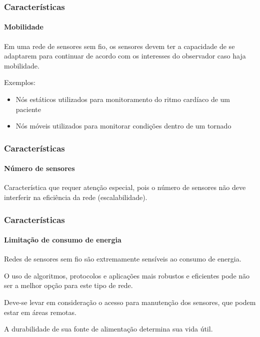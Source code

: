 \documentclass[notes]{beamer}
\begin{document}
\begin{frame}
\label{slide_17}
\frametitle{Características}
\framesubtitle{Mobilidade}

\begin{block}

Em uma rede de sensores sem fio, os sensores devem ter a capacidade de se adaptarem para continuar de acordo com os interesses do observador caso haja mobilidade.
\end{block} \pause

\begin{exampleblock}

Exemplos: \pause

\begin{itemize}
\item Nós estáticos utilizados para monitoramento do ritmo cardíaco de um paciente \pause
\item Nós móveis utilizados para monitorar condições dentro de um tornado
\end{itemize}

\end{exampleblock}

\end{frame}

\begin{frame}
\label{slide_18}
\frametitle{Características}
\framesubtitle{Número de sensores}

\begin{block}

Característica que requer atenção especial, pois o número de sensores não deve interferir na eficiência da rede (escalabilidade).
\end{block}

\end{frame}

\begin{frame}
\label{slide_19}
\frametitle{Características}
\framesubtitle{Limitação de consumo de energia}

\begin{block}

Redes de sensores sem fio são extremamente sensíveis ao consumo de energia. 
\end{block} \pause
\begin{block}

O uso de algoritmos, protocolos e aplicações mais robustos e eficientes pode não ser a melhor opção para este tipo de rede. 

\end{block} \pause

\begin{block}

Deve-se levar em consideração o acesso para manutenção dos sensores, que podem estar em áreas remotas.

\end{block} \pause

\begin{block}

A durabilidade de sua fonte de alimentação determina sua vida útil.

\end{block}

\end{frame}
\end{document}
